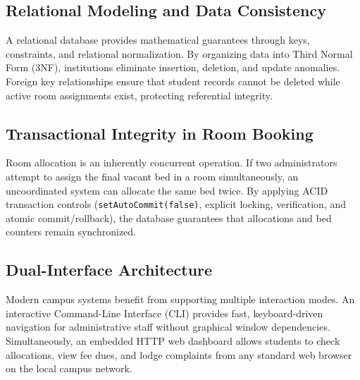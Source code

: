 \documentclass[12pt,a4paper]{report}
\begin{document}
\subsection{Relational Modeling and Data Consistency}
A relational database provides mathematical guarantees through keys, constraints, and relational normalization. By organizing data into Third Normal Form (3NF), institutions eliminate insertion, deletion, and update anomalies. Foreign key relationships ensure that student records cannot be deleted while active room assignments exist, protecting referential integrity.

\subsection{Transactional Integrity in Room Booking}
Room allocation is an inherently concurrent operation. If two administrators attempt to assign the final vacant bed in a room simultaneously, an uncoordinated system can allocate the same bed twice. By applying ACID transaction controls (\texttt{setAutoCommit(false)}, explicit locking, verification, and atomic commit/rollback), the database guarantees that allocations and bed counters remain synchronized.

\subsection{Dual-Interface Architecture}
Modern campus systems benefit from supporting multiple interaction modes. An interactive Command-Line Interface (CLI) provides fast, keyboard-driven navigation for administrative staff without graphical window dependencies. Simultaneously, an embedded HTTP web dashboard allows students to check allocations, view fee dues, and lodge complaints from any standard web browser on the local campus network.
\end{document}
